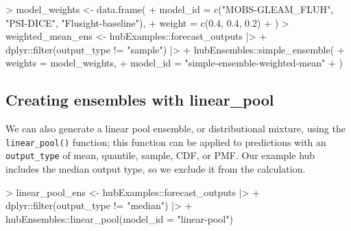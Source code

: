 \documentclass[
  letterpaper,
  DIV=11,
  numbers=noendperiod]{scrartcl}
\newenvironment{Shaded}{\begin{snugshade}}{\end{snugshade}}
\newcommand{\AttributeTok}[1]{\textcolor[rgb]{0.40,0.45,0.13}{#1}}
\newcommand{\FloatTok}[1]{\textcolor[rgb]{0.68,0.00,0.00}{#1}}
\newcommand{\FunctionTok}[1]{\textcolor[rgb]{0.28,0.35,0.67}{#1}}
\newcommand{\NormalTok}[1]{\textcolor[rgb]{0.00,0.23,0.31}{#1}}
\newcommand{\OtherTok}[1]{\textcolor[rgb]{0.00,0.23,0.31}{#1}}
\newcommand{\SpecialCharTok}[1]{\textcolor[rgb]{0.37,0.37,0.37}{#1}}
\newcommand{\StringTok}[1]{\textcolor[rgb]{0.13,0.47,0.30}{#1}}
\begin{document}
\begin{Shaded}
\begin{Highlighting}[]
\SpecialCharTok{\textgreater{}}\NormalTok{ model\_weights }\OtherTok{\textless{}{-}} \FunctionTok{data.frame}\NormalTok{(}
\SpecialCharTok{+}   \AttributeTok{model\_id =} \FunctionTok{c}\NormalTok{(}\StringTok{"MOBS{-}GLEAM\_FLUH"}\NormalTok{, }\StringTok{"PSI{-}DICE"}\NormalTok{, }\StringTok{"Flusight{-}baseline"}\NormalTok{),}
\SpecialCharTok{+}   \AttributeTok{weight =} \FunctionTok{c}\NormalTok{(}\FloatTok{0.4}\NormalTok{, }\FloatTok{0.4}\NormalTok{, }\FloatTok{0.2}\NormalTok{)}
\SpecialCharTok{+}\NormalTok{ )}
\SpecialCharTok{\textgreater{}}\NormalTok{ weighted\_mean\_ens }\OtherTok{\textless{}{-}}\NormalTok{ hubExamples}\SpecialCharTok{::}\NormalTok{forecast\_outputs }\SpecialCharTok{|\textgreater{}}
\SpecialCharTok{+}\NormalTok{   dplyr}\SpecialCharTok{::}\FunctionTok{filter}\NormalTok{(output\_type }\SpecialCharTok{!=} \StringTok{"sample"}\NormalTok{) }\SpecialCharTok{|\textgreater{}}
\SpecialCharTok{+}\NormalTok{   hubEnsembles}\SpecialCharTok{::}\FunctionTok{simple\_ensemble}\NormalTok{(}
\SpecialCharTok{+}     \AttributeTok{weights =}\NormalTok{ model\_weights,}
\SpecialCharTok{+}     \AttributeTok{model\_id =} \StringTok{"simple{-}ensemble{-}weighted{-}mean"}
\SpecialCharTok{+}\NormalTok{   )}
\end{Highlighting}
\end{Shaded}

\subsection{Creating ensembles with
linear\_pool}\label{creating-ensembles-with-linear_pool}

We can also generate a linear pool ensemble, or distributional mixture,
using the \texttt{linear\_pool()} function; this function can be applied
to predictions with an \texttt{output\_type} of mean, quantile, sample,
CDF, or PMF. Our example hub includes the median output type, so we
exclude it from the calculation.

\begin{Shaded}
\begin{Highlighting}[]
\SpecialCharTok{\textgreater{}}\NormalTok{ linear\_pool\_ens }\OtherTok{\textless{}{-}}\NormalTok{ hubExamples}\SpecialCharTok{::}\NormalTok{forecast\_outputs }\SpecialCharTok{|\textgreater{}}
\SpecialCharTok{+}\NormalTok{   dplyr}\SpecialCharTok{::}\FunctionTok{filter}\NormalTok{(output\_type }\SpecialCharTok{!=} \StringTok{"median"}\NormalTok{) }\SpecialCharTok{|\textgreater{}}
\SpecialCharTok{+}\NormalTok{   hubEnsembles}\SpecialCharTok{::}\FunctionTok{linear\_pool}\NormalTok{(}\AttributeTok{model\_id =} \StringTok{"linear{-}pool"}\NormalTok{)}
\end{Highlighting}
\end{Shaded}
\end{document}
